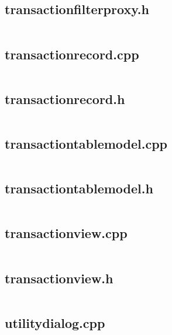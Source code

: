 \documentclass{article}
\begin{document}
\subsection{transactionfilterproxy.h}
\inputminted{cpp}{/home/dufferzafar/dev/@clones/bitcoin/src/qt/transactionfilterproxy.h}
\newpage

\subsection{transactionrecord.cpp}
\inputminted{cpp}{/home/dufferzafar/dev/@clones/bitcoin/src/qt/transactionrecord.cpp}
\newpage

\subsection{transactionrecord.h}
\inputminted{cpp}{/home/dufferzafar/dev/@clones/bitcoin/src/qt/transactionrecord.h}
\newpage

\subsection{transactiontablemodel.cpp}
\inputminted{cpp}{/home/dufferzafar/dev/@clones/bitcoin/src/qt/transactiontablemodel.cpp}
\newpage

\subsection{transactiontablemodel.h}
\inputminted{cpp}{/home/dufferzafar/dev/@clones/bitcoin/src/qt/transactiontablemodel.h}
\newpage

\subsection{transactionview.cpp}
\inputminted{cpp}{/home/dufferzafar/dev/@clones/bitcoin/src/qt/transactionview.cpp}
\newpage

\subsection{transactionview.h}
\inputminted{cpp}{/home/dufferzafar/dev/@clones/bitcoin/src/qt/transactionview.h}
\newpage

\subsection{utilitydialog.cpp}
\inputminted{cpp}{/home/dufferzafar/dev/@clones/bitcoin/src/qt/utilitydialog.cpp}
\newpage
\end{document}
